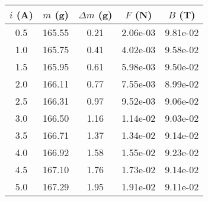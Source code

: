 \begin{tabular}{ccccc}
\toprule
$i$ (A) & $m$ (g) & $\Delta m$ (g) & $F$ (N) & $B$ (T) \\
\midrule
0.5 & 165.55 & 0.21 & 2.06e-03 & 9.81e-02 \\
1.0 & 165.75 & 0.41 & 4.02e-03 & 9.58e-02 \\
1.5 & 165.95 & 0.61 & 5.98e-03 & 9.50e-02 \\
2.0 & 166.11 & 0.77 & 7.55e-03 & 8.99e-02 \\
2.5 & 166.31 & 0.97 & 9.52e-03 & 9.06e-02 \\
3.0 & 166.50 & 1.16 & 1.14e-02 & 9.03e-02 \\
3.5 & 166.71 & 1.37 & 1.34e-02 & 9.14e-02 \\
4.0 & 166.92 & 1.58 & 1.55e-02 & 9.23e-02 \\
4.5 & 167.10 & 1.76 & 1.73e-02 & 9.14e-02 \\
5.0 & 167.29 & 1.95 & 1.91e-02 & 9.11e-02 \\
\bottomrule
\end{tabular}